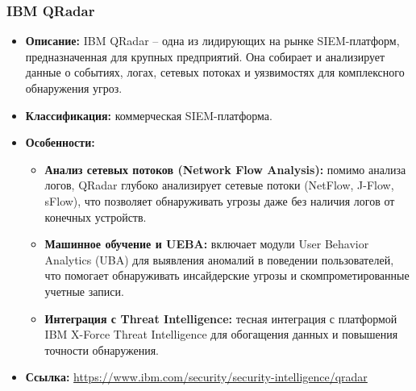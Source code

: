 \subsubsection{IBM QRadar}
\begin{itemize}
		\item \textbf{Описание:} IBM QRadar -- одна из лидирующих на рынке SIEM-платформ, предназначенная для крупных предприятий. Она собирает и анализирует данные о событиях, логах, сетевых потоках и уязвимостях для комплексного обнаружения угроз.
    \item \textbf{Классификация:} коммерческая SIEM-платформа.
    \item \textbf{Особенности:}
    \begin{itemize}
        \item \textbf{Анализ сетевых потоков (Network Flow Analysis):} помимо анализа логов, QRadar глубоко анализирует сетевые потоки (NetFlow, J-Flow, sFlow), что позволяет обнаруживать угрозы даже без наличия логов от конечных устройств.
        \item \textbf{Машинное обучение и UEBA:} включает модули User Behavior Analytics (UBA) для выявления аномалий в поведении пользователей, что помогает обнаруживать инсайдерские угрозы и скомпрометированные учетные записи.
        \item \textbf{Интеграция с Threat Intelligence:} тесная интеграция с платформой IBM X-Force Threat Intelligence для обогащения данных и повышения точности обнаружения.
    \end{itemize}
    \item \textbf{Ссылка:} \url{https://www.ibm.com/security/security-intelligence/qradar}
\end{itemize}

